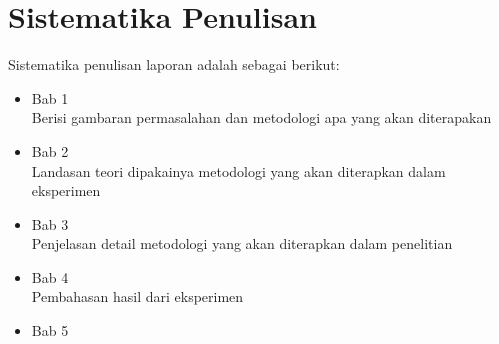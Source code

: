 \section{Sistematika Penulisan}
Sistematika penulisan laporan adalah sebagai berikut:
\begin{itemize}
	\item Bab 1 \babSatu \\
	Berisi gambaran permasalahan dan metodologi apa yang akan diterapakan
	\item Bab 2 \babDua \\
	Landasan teori dipakainya metodologi yang akan diterapkan dalam eksperimen
	\item Bab 3 \babTiga \\
	Penjelasan detail metodologi yang akan diterapkan dalam penelitian
	\item Bab 4 \babEmpat \\
	Pembahasan hasil dari eksperimen
	\item Bab 5 \kesimpulan \\
\end{itemize}


